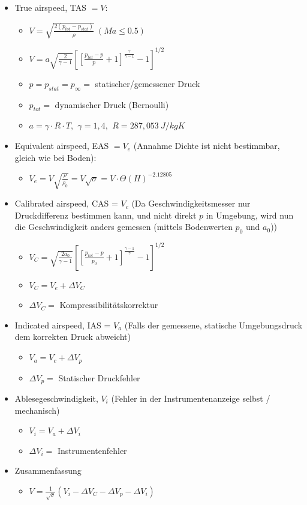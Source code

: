 \documentclass[8pt, landscape, fleqn]{scrartcl}
\begin{document}
\begin{multicols*}{3}
\begin{itemize}
    \item True airspeed, TAS $ = V$:
    \begin{itemize}
        \item $ V = \sqrt{\frac{2(p_{tot}-p_{stat})}{\rho}} ~ (Ma \leq 0.5)$
        \item $ V = a \sqrt{\frac{2}{\gamma-1}}\left[\left[\frac{p_{tot}-p}{p}+1\right]^{\frac{\gamma}{\gamma-1}}-1\right]^{1/2}$
        \item $p = p_{stat} = p_\infty =$ statischer/gemessener Druck
        \item $p_{tot} =$ dynamischer Druck (Bernoulli)
        \item $a  =\gamma \cdot R\cdot T$, $~\gamma = 1,4$, $~ R = 287,053~ J/kgK $
    \end{itemize}
    \item Equivalent airspeed, EAS $ = V_e$ (Annahme Dichte ist nicht bestimmbar, gleich wie bei Boden): 
    \begin{itemize}
        \item $V_e = V \sqrt{\frac{\rho}{\rho_0}} = V \sqrt{\sigma} = V \cdot\Theta(H)^{-2.12805}$
    \end{itemize}
    \item Calibrated airspeed, CAS = $ V_c$ (Da Geschwindigkeitsmesser nur Druckdifferenz bestimmen kann, und nicht direkt $p$ in Umgebung, wird nun die Geschwindigkeit anders gemessen (mittels Bodenwerten $p_0$ und $a_0$))
    \begin{itemize}
        \item $V_C = \sqrt{\frac{2 a_0}{\gamma-1}} \left[ \left[\frac{p_{tot}-p}{p_0}+1\right]^{\frac{\gamma-1}{\gamma}}-1\right]^{1/2}$
        \item $V_C = V_e + \Delta V_C$ 
        \item $\Delta V_C=$ Kompressibilitätskorrektur
    \end{itemize}
    \item Indicated airspeed, IAS = $ V_a$ (Falls der gemessene, statische Umgebungsdruck dem korrekten Druck abweicht)
    \begin{itemize}
        \item $V_a = V_c + \Delta V_p$
        \item $\Delta V_p =$ Statischer Druckfehler 
    \end{itemize}
    \item Ablesegeschwindigkeit, $V_i$ (Fehler in der Instrumentenanzeige selbst / mechanisch)
    \begin{itemize}
        \item $V_i = V_a + \Delta V_i$
        \item $\Delta V_i =$ Instrumentenfehler
    \end{itemize}
    \item Zusammenfassung
    \begin{itemize}
        \item $V = \frac{1}{\sqrt{\sigma}}(V_i - \Delta V_C - \Delta V_p - \Delta V_i)$
    \end{itemize}
\end{itemize}


\end{multicols*}
\end{document}
